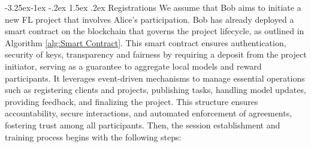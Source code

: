 \documentclass[a4paper,fleqn]{cas-dc}
\makeatletter
\renewcommand\subsubsection{\@startsection{subsubsection}{3}{\z@}%
   {-3.25ex\@plus -1ex \@minus -.2ex}%
   {1.5ex \@plus .2ex}%
   {\normalfont\normalsize}} %
\makeatother
\begin{document}
\subsubsection{Registrations}
We assume that Bob aims to initiate a new FL project that involves Alice's participation. 
Bob has already deployed a smart contract on the blockchain that governs the project lifecycle, as outlined in Algorithm \ref{alg:Smart Contract}. 
This smart contract ensures authentication, security of keys, transparency and fairness by requiring a deposit from the project initiator, serving as a guarantee to aggregate local models and reward participants. 
It leverages event-driven mechanisms to manage essential operations such as registering clients and projects, publishing tasks, handling model updates, providing feedback, and finalizing the project.
This structure ensures accountability, secure interactions, and automated enforcement of agreements, fostering trust among all participants.
Then, the session establishment and training process begins with the following steps:
\end{document}
